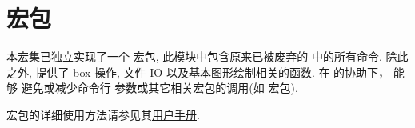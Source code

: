 
\clearpage
\section{ 宏包}\label{pkg:ztool}
本宏集已独立实现了一个  宏包, 此模块中包含原来已被废弃的  中的所有命令.
除此之外,  提供了 box 操作, 文件 IO 以及基本图形绘制相关的函数. 在  的协助下，\ztex{} 能够
避免或减少命令行  参数或其它相关宏包的调用(如  宏包).

 宏包的详细使用方法请参见其\href{https://github.com/zongpingding/zTeX_bundle/blob/main/ztex/ztool/doc/ztool_interface.pdf}{用户手册}.
